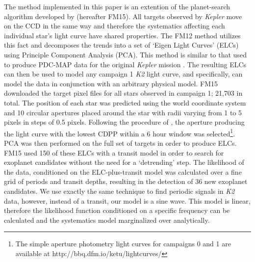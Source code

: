 \documentclass[useAMS, usenatbib]{aastex}
\begin{document}
The method implemented in this paper is an extention of the planet-search
algorithm developed by \citet{Foreman-Mackey2015} (hereafter FM15).
All targets observed by {\it Kepler} move on the CCD in the same way and
therefore the systematics affecting each individual star's light curve have
shared properties.
The FM12 method utilizes this fact and decomposes the trends into a set of
`Eigen Light Curves' (ELCs) using Principle Component Analysis (PCA).
This method is similar to that used to produce PDC-MAP data for the original
{\it Kepler} mission \citep[][]{Stumpe2012, Smith2012}.
The resulting ELCs can then be used to model any campaign 1 {\it K2} light
curve, and specifically, can model the data in conjunction with an arbitrary
physical model.  FM15 downloaded the target pixel files for all stars observed
in campaign 1; 21,703 in total.
The position of each star was predicted using the world coordinate system and
10 circular apertures placed around the star with radii varying from 1 to
5 pixels in steps of 0.5 pixels.
Following the procedure of \citet{Vanderburg2014}, the aperture producing the
light curve with the lowest CDPP within a 6 hour window
\citet{Christiansen2012} was selected\footnote{The simple aperture photometry
light curves for campaigns 0 and 1 are available at
http://bbq.dfm.io/ketu/lightcurves/}.
PCA was then performed on the full set of targets in order to produce ELCs.
FM15 used 150 of these ELCs with a transit model in order to
search for exoplanet candidates without the need for a `detrending' step.
The likelihood of the data, conditioned on the ELC-plus-transit
model was calculated over a fine grid of periods and transit depths, resulting
in the detection of 36 new exoplanet candidates.
We use exactly the same technique to find periodic signals in {\it K2} data,
however, instead of a transit, our model is a sine wave.
This model is linear, therefore the likelihood function conditioned on
a specific frequency can be calculated and the systematics model marginalized
over analytically.
\end{document}
